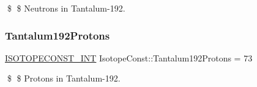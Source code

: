 \$ \$ Neutrons in Tantalum-\/192. \mbox{\label{group___isotope_const-_tantalum-_ta192_ga8805a722345490fa88cdf9c3654ba3d6}} 
\subsubsection{\texorpdfstring{Tantalum192\+Protons}{Tantalum192Protons}}
{\footnotesize\ttfamily \mbox{\hyperlink{group___isotope_const-_macros_ga5f18360b3e99483a35c32d789e62621c}{I\+S\+O\+T\+O\+P\+E\+C\+O\+N\+S\+T\+\_\+\+I\+NT}} Isotope\+Const\+::\+Tantalum192\+Protons = 73}

\$ \$ Protons in Tantalum-\/192. 